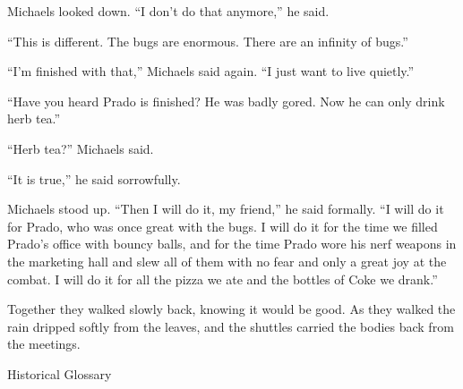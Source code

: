 Michaels looked down. ``I don't do that anymore,'' he said.

``This is different. The bugs are enormous. There are an infinity of
bugs.''

``I'm finished with that,'' Michaels said again. ``I just want to live
quietly.''

``Have you heard Prado is finished? He was badly gored. Now he can only
drink herb tea.''

``Herb tea?'' Michaels said.

``It is true,'' he said sorrowfully.

Michaels stood up. ``Then I will do it, my friend,'' he said
formally. ``I will do it for Prado, who was once great with the bugs. I
will do it for the time we filled Prado's office with bouncy balls,
and for the time Prado wore his nerf weapons in the marketing hall and
slew all of them with no fear and only a great joy at the combat. I
will do it for all the pizza we ate and the bottles of Coke we drank.''

Together they walked slowly back, knowing it would be good. As they
walked the rain dripped softly from the leaves, and the shuttles
carried the bodies back from the meetings.

\bigskip
{\twelvebf \noindent Historical Glossary}
\medskip
{}

\bye
